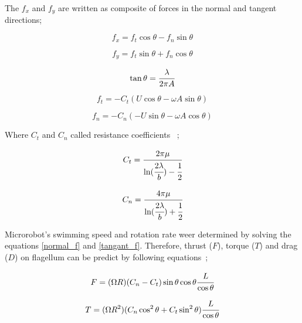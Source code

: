 \documentclass[12pt,a4paper,titlepage]{report}
\begin{document}
The $f_x$ and $f_y$ are written as composite of forces in the normal and tangent directions;

\begin{equation}
 f_x  = f_t\cos \theta - f_n\sin \theta
\label{normal}
\end{equation}



\begin{equation}
 f_y = f_t\sin \theta + f_n\cos \theta
\label{tangant}
\end{equation}

\begin{equation}
 \tan \theta  = \cfrac{\lambda}{2\pi A}
\label{tang}
\end{equation}



\begin{equation}
 f_t = -C_t(U \cos \theta - \omega A \sin \theta)
\label{normal_f}
\end{equation}



\begin{equation}
f_n = - C_n(-U \sin \theta - \omega A \cos \theta)
\label{tangant_f}
\end{equation}

Where $C_t$ and $C_n$ called resistance coefficients ~\citep{edd2003biomimetic};
 

\begin{equation}
 C_t = \cfrac{2 \pi \mu}{\ln (\cfrac{2 \lambda}{b}) - \cfrac{1}{2}}
\label{Coeffient1}
\end{equation}



\begin{equation}
 C_n = \cfrac{4 \pi \mu}{\ln (\cfrac{2 \lambda}{b}) + \cfrac{1}{2}}
\label{Coeffient1}
\end{equation}

Microrobot\rq{}s swimming speed and rotation rate weer determined by solving 
the equations \ref{normal_f} and \ref{tangant_f}. Therefore, thrust ($F$), torque ($T$) and drag ($D$) 
on flagellum can be predict by following equations~\citep{rodenborn2013propulsion};

\begin{equation}
 F = (\Omega R)(C_n - C_t) \sin \theta \cos \theta \cfrac{L}{\cos \theta} 
\label{thrust}
\end{equation}

\begin{equation}
 T = (\Omega R^2)(C_n \cos ^2 \theta + C_t \sin ^2 \theta) \cfrac{L}{\cos \theta}
\label{torque}
\end{equation}
\end{document}
